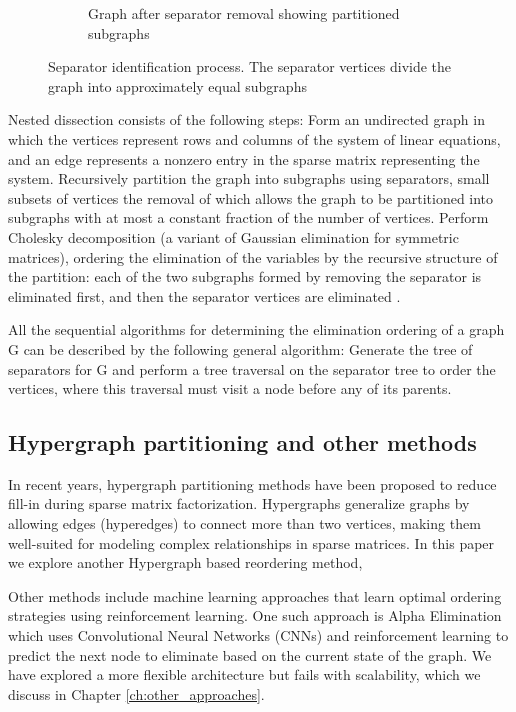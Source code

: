 \begin{figure}[htbp]
\begin{subfigure}[b]{0.45\textwidth}
        \caption{Graph after separator removal showing partitioned subgraphs}
        \label{fig:nd-separated}
    \end{subfigure}
    \caption{Separator identification process. The separator vertices divide the graph into approximately equal subgraphs}
    \label{fig:nested-dissection}
\end{figure}

Nested dissection consists of the following steps: Form an undirected graph in which the vertices represent rows and columns of the system of linear equations, and an edge represents a nonzero entry in the sparse matrix representing the system. Recursively partition the graph into subgraphs using separators, small subsets of vertices the removal of which allows the graph to be partitioned into subgraphs with at most a constant fraction of the number of vertices. Perform Cholesky decomposition (a variant of Gaussian elimination for symmetric matrices), ordering the elimination of the variables by the recursive structure of the partition: each of the two subgraphs formed by removing the separator is eliminated first, and then the separator vertices are eliminated \cite{george_nested_1973}. 

All the sequential algorithms for determining the elimination ordering of a graph G can be described by the following general algorithm: Generate the tree of separators for G and perform a tree traversal on the separator tree to order the vertices, where this traversal must visit a node before any of its parents.

\subsection{Hypergraph partitioning and other methods}

In recent years, hypergraph partitioning methods \cite{catalyurek_hypergraph_2011} have been proposed to reduce fill-in during sparse matrix factorization. Hypergraphs generalize graphs by allowing edges (hyperedges) to connect more than two vertices, making them well-suited for modeling complex relationships in sparse matrices. In this paper we explore another Hypergraph based reordering method, 

Other methods include machine learning approaches that learn optimal ordering strategies using reinforcement learning. One such approach is Alpha Elimination \cite{dasgupta_alpha_2023} which uses Convolutional Neural Networks (CNNs) and reinforcement learning to predict the next node to eliminate based on the current state of the graph. We have explored a more flexible architecture but fails with scalability, which we discuss in Chapter \ref{ch:other_approaches}.

